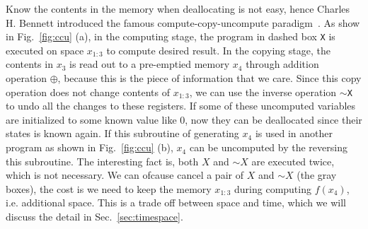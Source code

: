 \documentclass[aps,twocolumn,longbibliography,english,superscriptaddress]{revtex4-1}
\newcommand{\<}{\langle}
\renewcommand{\>}{\rangle}
\newcommand{\Fig}[1]{Fig.~\ref{#1}}
\newcommand{\Sec}[1]{Sec.~\ref{#1}}
\theoremstyle{definition}\newtheorem{definition}{\textit{Definition}}
\begin{document}
Know the contents in the memory when deallocating is not easy, hence Charles H. Bennett introduced the famous compute-copy-uncompute paradigm~\cite{Bennett1973}.
As show in \Fig{fig:ccu} (a), in the computing stage, the program in dashed box \texttt{X} is executed on space $x_{1\colon3}$ to compute desired result. In the copying stage, the contents in $x_3$ is read out to a pre-emptied memory $x_4$ through addition operation $\oplus$, because this is the piece of information that we care.
Since this copy operation does not change contents of $x_{1\colon3}$, we can use the inverse operation \texttt{$\sim$X} to undo all the changes to these registers. If some of these uncomputed variables are initialized to some known value like $0$, now they can be deallocated since their states is known again.
If this subroutine of generating $x_4$ is used in another program as shown in \Fig{fig:ccu} (b), $x_4$ can be uncomputed by the reversing this subroutine.
The interesting fact is, both $X$ and $\sim X$ are executed twice, which is not necessary. We can ofcause cancel a pair of $X$ and $\sim X$ (the gray boxes), the cost is we need to keep the memory $x_{1\colon3}$ during computing $f(x_4)$, i.e. additional space. This is a trade off between space and time, which we will discuss the detail in \Sec{sec:timespace}.
\end{document}
